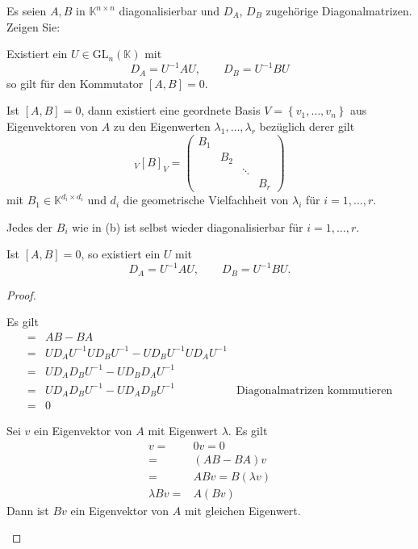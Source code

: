 \begin{Problem}
	Es seien $A,B$ in $\mathbb{K}^{n\times n}$ diagonalisierbar und $D_A$, $D_B$ zugehörige Diagonalmatrizen. Zeigen Sie:
	\begin{parts}
	\item Existiert ein $U\in \text{GL}_n(\mathbb{K})$ mit
		\[
			D_A=U^{-1}AU,\qquad D_B=U^{-1}BU
		\]
		so gilt f\"{u}r den Kommutator $[A,B]=0$.
	\item Ist $[A,B]=0$, dann existiert eine geordnete Basis $V=\left\{ v_1,\dots, v_n \right\} $ aus Eigenvektoren von $A$ zu den Eigenwerten $\lambda_1,\dots, \lambda_r$ bezüglich derer gilt
		\[
			_V[B]_V=\begin{pmatrix} B_1 & & &\\ & B_2 & &\\& & \ddots &\\ & & & B_r \end{pmatrix} 
		\]
		mit $B_1\in\mathbb{K}^{d_i\times d_i}$ und $d_i$ die geometrische Vielfachheit von $\lambda_i$ f\"{u}r $i=1,\dots, r$.
	\item Jedes der $B_i$ wie in (b) ist selbst wieder diagonalisierbar f\"{u}r $i=1,\dots, r$.
	\item Ist $[A,B]=0$, so existiert ein $U$ mit
		\[
			D_A=U^{-1}AU,\qquad D_B=U^{-1}BU
		.\] 
	\end{parts}
\end{Problem}
\begin{proof}
	\begin{parts}
	\item Es gilt
		\begin{align*}
			[A,B]=&AB-BA\\
			=&UD_AU^{-1}UD_BU^{-1}-UD_BU^{-1}UD_AU^{-1}\\
			=&UD_AD_BU^{-1}-UD_BD_AU^{-1}\\
			=&UD_AD_BU^{-1}-UD_AD_BU^{-1} & \text{Diagonalmatrizen kommutieren}\\
			=&0
		\end{align*}
	\item Sei $v$ ein Eigenvektor von $A$ mit Eigenwert $\lambda$. Es gilt
		\begin{align*}
			[A,B]v=&0v=0\\
			=&(AB-BA)v\\
			=&ABv=B(\lambda v)\\
			\lambda Bv=&A(Bv)
		\end{align*}
		Dann ist $Bv$ ein Eigenvektor von $A$ mit gleichen Eigenwert.
	\end{parts}
\end{proof}
